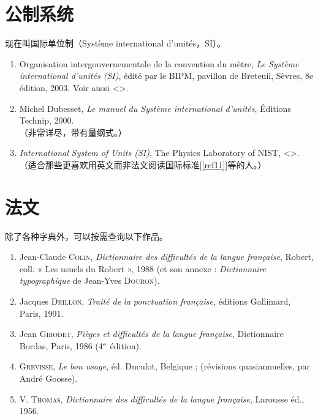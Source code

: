 \section{公制系统}

现在叫国际单位制（Système international d'unités，SI）。

\begin{enumerate}[resume]
    \item Organisation intergouvernementale de la convention du mètre, \emph{Le Système international d'unités (SI)}, édité par le BIPM, pavillon de Breteuil, Sèvres, 8e édition, 2003. Voir aussi <>. \label{ref11}
    \item Michel Dubesset, \emph{Le manuel du Système international d'unités}, Éditions Technip, 2000.\\
    （非常详尽，带有量纲式。）\label{ref12}
    \item \emph{International System of Units (SI)}, The Physics Laboratory of NIST, <>.
    （适合那些更喜欢用英文而非法文阅读国际标准[\ref{ref11}]等的人。）\label{ref13}
\end{enumerate}

\section{法文}

除了各种字典外，可以按需查询以下作品。

\begin{enumerate}[resume]
    \item Jean-Claude \textsc{Colin}, \emph{Dictionnaire des difficultés de la langue française}, Robert, coll. « Les usuels du Robert », 1988 (et son annexe : \emph{Dictionnaire typographique} de Jean-Yves \textsc{Douron}).\label{ref14}
    \item Jacques \textsc{Drillon}, \emph{Traité de la ponctuation française}, éditions Gallimard, Paris, 1991.\label{ref15}
    \item Jean \textsc{Girodet}, \emph{Pièges et difficultés de la langue française}, Dictionnaire Bordas, Paris, 1986 (4$^{\rm e}$ édition).\label{ref16}
    \item \textsc{Grevisse}, \emph{Le bon usage}, éd. Duculot, Belgique ; (révisions quasiannuelles, par André Goosse).\label{ref17}
    \item V. \textsc{Thomas}, \emph{Dictionnaire des difficultés de la langue française}, Larousse éd., 1956.\label{ref18}
\end{enumerate}

